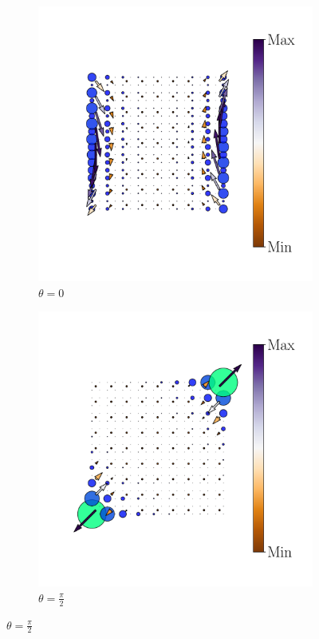 \begin{figure}[tbh!]
\begin{minipage}[h!]{1.0\textwidth}
\begin{subfigure}[b!]{0.2 \textwidth}
         \end{subfigure}\hspace*{-0.5em}
          \begin{subfigure}[b!]{0.2 \textwidth}
             \caption*{$\theta = 0$}
             \includegraphics[width=\textwidth]{Imagenes/Resultados_pump_Cuadrado/y/hoti_pomp_y_neg3.pdf}
         \end{subfigure}\hspace*{-0.5em}
          \begin{subfigure}[b!]{0.2 \textwidth}
             \caption*{$\theta = \frac{\pi}{2}$}
             \includegraphics[width=\textwidth]{Imagenes/Resultados_pump_Cuadrado/y/hoti_pomp_y_neg4.pdf}

\end{subfigure}
\end{minipage}
\end{figure}
